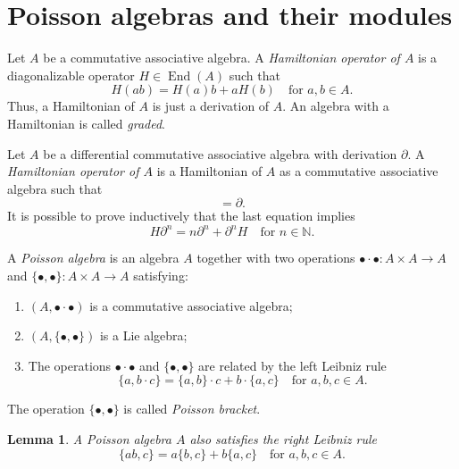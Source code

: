 \documentclass[a4paper, 12pt, reqno]{amsart}
\newtheorem{lemma}[theorem]{Lemma}
\theoremstyle{remark}
\DeclareMathOperator{\End}{End}
\begin{document}
\section{Poisson algebras and their modules}
\label{sec:poiss-algebr-their}

Let $A$ be a commutative associative algebra.
A \emph{Hamiltonian operator of $A$} is a diagonalizable operator $H \in \End(A)$ such that
\begin{equation*}
  H(ab) = H(a)b + aH(b) \quad \text{for $a, b \in A$}.
\end{equation*}
Thus, a Hamiltonian of $A$ is just a derivation of $A$.
An algebra with a Hamiltonian is called \emph{graded}.

Let $A$ be a differential commutative associative algebra with derivation $\partial$.
A \emph{Hamiltonian operator of $A$} is a Hamiltonian of $A$ as a commutative associative algebra such that
\begin{equation*}
  [H, \partial] = \partial.
\end{equation*}
It is possible to prove inductively that the last equation implies
\begin{equation}
  \label{eq:56}
  H\partial^n = n\partial^n + \partial^nH \quad \text{for $n \in \mathbb{N}$}.
\end{equation}

A \emph{Poisson algebra} is an algebra $A$ together with two operations $\bullet\cdot\bullet: A \times A \to A$ and $\{\bullet, \bullet\}: A \times A \to A$ satisfying:
\begin{enumerate}
\item $(A, \bullet\cdot\bullet)$ is a commutative associative algebra;
\item $(A, \{\bullet, \bullet\})$ is a Lie algebra;
\item The operations $\bullet\cdot\bullet$ and $\{\bullet, \bullet\}$ are related by the left Leibniz rule
  \begin{equation*}
    \{a, b\cdot c\} = \{a, b\}\cdot c + b\cdot\{a, c\} \quad \text{for $a, b, c \in A$}.
  \end{equation*}
\end{enumerate}
The operation $\{\bullet, \bullet\}$ is called \emph{Poisson bracket}.

\begin{lemma}
  \label{lmm:40}
  A Poisson algebra $A$ also satisfies the right Leibniz rule
  \begin{equation*}
    \{ab, c\} = a\{b, c\} + b\{a, c\} \quad \text{for $a, b, c \in A$}.
  \end{equation*}
\end{lemma}
\end{document}
